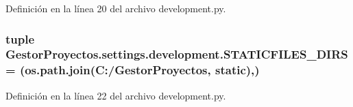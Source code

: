 Definición en la línea 20 del archivo development.\+py.

\subsubsection[{\texorpdfstring{S\+T\+A\+T\+I\+C\+F\+I\+L\+E\+S\+\_\+\+D\+I\+RS}{STATICFILES_DIRS}}]{\setlength{\rightskip}{0pt plus 5cm}tuple Gestor\+Proyectos.\+settings.\+development.\+S\+T\+A\+T\+I\+C\+F\+I\+L\+E\+S\+\_\+\+D\+I\+RS = (os.\+path.\+join(\textquotesingle{}C\+:/Gestor\+Proyectos\textquotesingle{}, \textquotesingle{}static\textquotesingle{}),)}\hypertarget{namespace_gestor_proyectos_1_1settings_1_1development_a20b43056463f206b7faca50b3f3fcd3c}{}\label{namespace_gestor_proyectos_1_1settings_1_1development_a20b43056463f206b7faca50b3f3fcd3c}


Definición en la línea 22 del archivo development.\+py.

